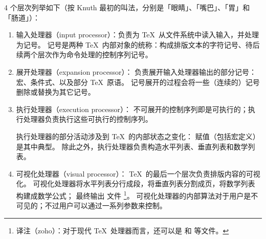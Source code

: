 \documentclass{book}
\begin{document}
4 个层次列举如下（按 Knuth 最初的叫法，分别是「眼睛」、「嘴巴」、「胃」和「肠道」）：
\begin{enumerate}
\item 输入处理器（input processor）：负责为 \TeX\ 从文件系统中读入输入，并处理为记号。
记号是两种 \TeX\ 内部对象的统称：构成排版文本的字符记号、待后续两个层次作为命令处理的控制序列记号。
\item 展开处理器（expansion processor）：
负责展开输入处理器输出的部分记号：宏、条件式、以及部分 \TeX\ 原语。
记号展开的过程会将一些（连续的）记号删除或替换为其它记号。
\item 执行处理器（execution processor）：
不可展开的控制序列即是可执行的；执行处理器负责执行这些可执行的控制序列。

执行处理器的部分活动涉及到 \TeX\ 的内部状态之变化：
赋值（包括宏定义）是其中典型。
除此之外，执行处理器负责构造水平列表、垂直列表和数学列表。
\item 可视化处理器（visual processor）：
\TeX\ 的最后一个层次负责排版内容的可视化。
可视化处理器将水平列表分行成段，将垂直列表分割成页，将数学列表构建成数学公式；
最终输出  文件%
\footnote{译注（zoho）：对于现代 \TeX\ 处理器而言，还可以是  和  等文件。}。
可视化处理器的内部算法对于用户是不可见的；不过用户可以通过一系列参数来控制。
\end{enumerate}
\end{document}
